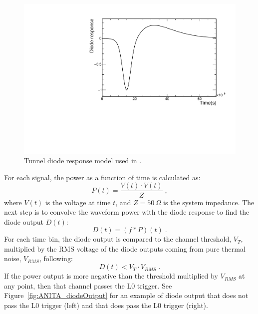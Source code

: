 \begin{figure}[!h]\centering
  \includegraphics[width=.45\linewidth]{./Figs/FullBand_diodeResponse.pdf}
  \caption{Tunnel diode response model used in \icemc.}
  \label{fig:ANITA_diodeModel}
\end{figure}

For each signal, the power as a function of time is calculated as:
\begin{equation}
  P (t) = \dfrac{V(t) \cdot V(t)}{Z} \;,
\end{equation}
\noindent where $V(t)$ is the voltage at time $t$, and $Z=50\,\Omega$ is the system impedance.
The next step is to convolve the waveform power with the diode
response to find the diode output $D(t)$:
\begin{equation}
  D(t) = (f * P)(t) \;.
\end{equation}
For each time bin, the diode output is compared to the channel
threshold, $V_T$, multiplied by the RMS voltage of the diode outputs coming from pure thermal noise, $V_{RMS}$, following:
\begin{equation} 
  D(t) < V_T \cdot V_{RMS} \;.
\end{equation}
If the power output is more negative than the threshold multiplied by $V_{RMS}$ at any point, then that channel passes the L0 trigger.
  See Figure~\ref{fig:ANITA_diodeOutput} for an example of diode
  output that does not pass the L0 trigger (left) and that does pass
  the L0 trigger (right).

